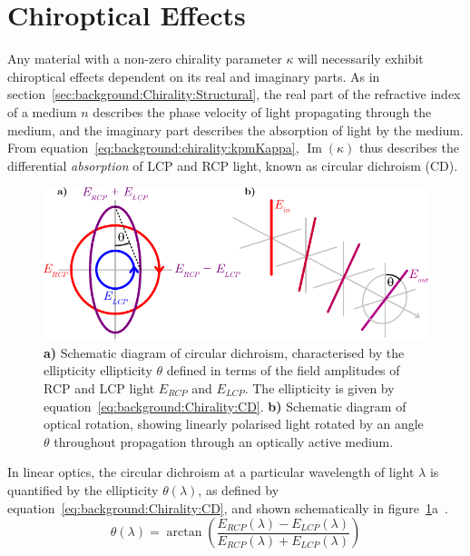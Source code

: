 \section{Chiroptical Effects}\label{sec:background:Chirality:Chiroptics}
Any material with a non-zero chirality parameter $\kappa$ will necessarily exhibit chiroptical effects dependent on its real and imaginary parts. As in section~\ref{sec:background:Chirality:Structural}, the real part of the refractive index of a medium $n$ describes the phase velocity of light propagating through the medium, and the imaginary part describes the absorption of light by the medium. From equation~\ref{eq:background:chirality:kpmKappa}, $\operatorname{Im}(\kappa)$ thus describes the differential \textit{absorption} of LCP and RCP light, known as circular dichroism (CD). 
\begin{figure}[htb!]
    \centering
    \includegraphics[scale=1.0]{./figures/background/chiroptics/cdor.pdf}
    \caption{\label{fig:background:Chirality:cdor}\textbf{a)} Schematic diagram of circular dichroism, characterised by the ellipticity ellipticity $\theta$ defined in terms of the field amplitudes of RCP and LCP light $E_{RCP}$ and $E_{LCP}$. The ellipticity is given by equation~\ref{eq:background:Chirality:CD}. \textbf{b)} Schematic diagram of optical rotation, showing linearly polarised light rotated by an angle $\theta$ throughout propagation through an optically active medium.}
\end{figure}
In linear optics, the circular dichroism at a particular wavelength of light $\lambda$ is quantified by the ellipticity $\theta(\lambda)$, as defined by equation~\ref{eq:background:Chirality:CD}, and shown schematically in figure~\ref{fig:background:Chirality:cdor}a~\cite[\S 9.2]{Parson2007}. 
\begin{equation}\label{eq:background:Chirality:CD}
    \theta(\lambda) = \arctan\left( \frac{E_{RCP}(\lambda) - E_{LCP}(\lambda)}{E_{RCP}(\lambda) + E_{LCP}(\lambda)} \right)
\end{equation} 
